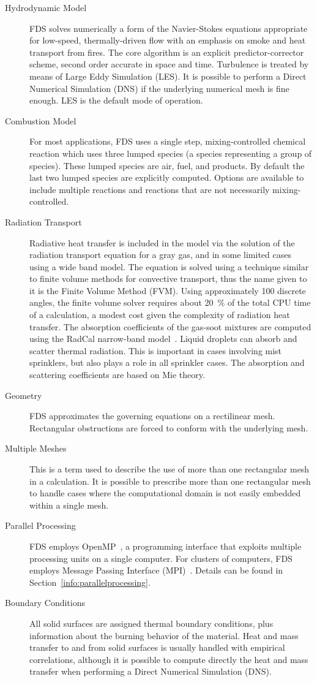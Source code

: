 \documentclass[11pt]{book}
\begin{document}
\begin{description}
\item[Hydrodynamic Model] FDS solves numerically a form of the Navier-Stokes equations appropriate for low-speed, thermally-driven flow with an emphasis on smoke and heat transport from fires. The core algorithm is an explicit predictor-corrector scheme, second order accurate in space and time. Turbulence is treated by means of Large Eddy Simulation (LES). It is possible to perform a Direct Numerical Simulation (DNS) if the underlying numerical mesh is fine enough. LES is the default mode of operation.
\item[Combustion Model] For most applications, FDS uses a single step, mixing-controlled chemical reaction which uses three lumped species (a species representing a group of species). These lumped species are air, fuel, and products. By default the last two lumped species are explicitly computed. Options are available to include multiple reactions and reactions that are not necessarily mixing-controlled.
\item[Radiation Transport] Radiative heat transfer is included in the model via the solution of the radiation transport equation for a gray gas, and in some limited cases using a wide band model. The equation is solved using a technique similar to finite volume methods for convective transport, thus the name given to it is the Finite Volume Method (FVM).  Using approximately 100 discrete angles, the finite volume solver requires about 20~\% of the total CPU time of a calculation, a modest cost given the complexity of radiation heat transfer. The absorption coefficients of the gas-soot mixtures are computed using the RadCal narrow-band model~\cite{RadCal}.  Liquid droplets can absorb and scatter thermal radiation. This is important in cases involving mist sprinklers, but also plays a role in all sprinkler cases.  The absorption and scattering coefficients are based on Mie theory.
\item[Geometry] FDS approximates the governing equations on a rectilinear mesh. Rectangular obstructions are forced to conform with the underlying mesh.
\item[Multiple Meshes] This is a term used to describe the use of more than one rectangular mesh in a calculation. It is possible to prescribe more than one rectangular mesh to handle cases where the computational domain is not easily embedded within a single mesh.
\item[Parallel Processing] FDS employs OpenMP~\cite{Chapman:OpenMP}, a programming interface that exploits multiple processing units on a single computer. For clusters of computers, FDS employs Message Passing Interface (MPI)~\cite{Gropp:1}. Details can be found in Section~\ref{info:parallelprocessing}.
\item[Boundary Conditions] All solid surfaces are assigned thermal boundary conditions, plus information about the burning behavior of the material. Heat and mass transfer to and from solid surfaces is usually handled with empirical correlations, although it is possible to compute directly the heat and mass transfer when performing a Direct Numerical Simulation (DNS).
\end{description}
\end{document}
